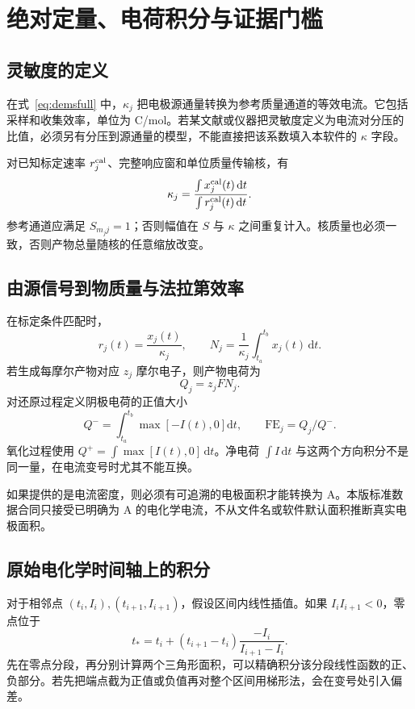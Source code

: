 \chapter{绝对定量、电荷积分与证据门槛}
\section{灵敏度的定义}
在式~\eqref{eq:demsfull} 中，$\kappa_j$ 把电极源通量转换为参考质量通道的等效电流。它包括采样和收集效率，单位为 C/mol。若某文献或仪器把灵敏度定义为电流对分压的比值，必须另有分压到源通量的模型，不能直接把该系数填入本软件的 $\kappa$ 字段。

对已知标定速率 $r_j^{\rm cal}$、完整响应窗和单位质量传输核，有
\begin{equation}
\kappa_j=\frac{\int x_j^{\rm cal}(t)\,\mathrm dt}
{\int r_j^{\rm cal}(t)\,\mathrm dt}.
\end{equation}
参考通道应满足 $S_{m_jj}=1$；否则幅值在 $S$ 与 $\kappa$ 之间重复计入。核质量也必须一致，否则产物总量随核的任意缩放改变。

\section{由源信号到物质量与法拉第效率}
在标定条件匹配时，
\begin{equation}
 r_j(t)=\frac{x_j(t)}{\kappa_j},\qquad
 N_j=\frac1{\kappa_j}\int_{t_a}^{t_b}x_j(t)\,\mathrm dt.
\end{equation}
若生成每摩尔产物对应 $z_j$ 摩尔电子，则产物电荷为
\begin{equation}
 Q_j=z_jFN_j.
\end{equation}
对还原过程定义阴极电荷的正值大小
\begin{equation}
 Q^- =\int_{t_a}^{t_b}\max[-I(t),0] \mathrm dt,
\qquad \mathrm{FE}_j=Q_j/Q^-.
\end{equation}
氧化过程使用 $Q^+=\int\max[I(t),0]\,\mathrm dt$。净电荷 $\int I\,\mathrm dt$ 与这两个方向积分不是同一量，在电流变号时尤其不能互换。

如果提供的是电流密度，则必须有可追溯的电极面积才能转换为 A。本版标准数据合同只接受已明确为 A 的电化学电流，不从文件名或软件默认面积推断真实电极面积。

\section{原始电化学时间轴上的积分}
对于相邻点 $(t_i,I_i),(t_{i+1},I_{i+1})$，假设区间内线性插值。如果 $I_iI_{i+1}<0$，零点位于
\begin{equation}
 t_*=t_i+(t_{i+1}-t_i)\frac{-I_i}{I_{i+1}-I_i}.
\end{equation}
先在零点分段，再分别计算两个三角形面积，可以精确积分该分段线性函数的正、负部分。若先把端点截为正值或负值再对整个区间用梯形法，会在变号处引入偏差。

